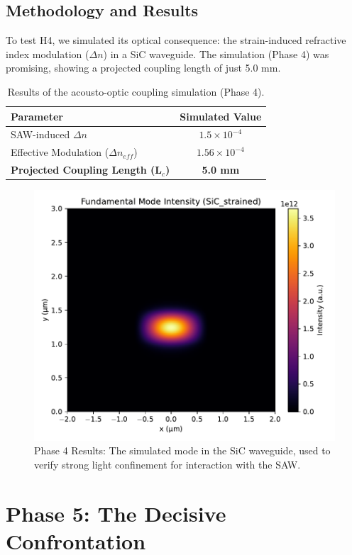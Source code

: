 \documentclass{article}
\begin{document}
\subsection{Methodology and Results}
To test H4, we simulated its optical consequence: the strain-induced refractive index modulation ($\Delta n$) in a SiC waveguide. The simulation (Phase 4) was promising, showing a projected coupling length of just 5.0 mm.

\begin{table}[H]
\caption{Results of the acousto-optic coupling simulation (Phase 4).}
\label{tab:cycle4}
\centering
\begin{tabular}{lc}
\toprule
\textbf{Parameter} & \textbf{Simulated Value} \\
\midrule
SAW-induced $\Delta n$ & $1.5 \times 10^{-4}$ \\
Effective Modulation ($\Delta n_{eff}$) & $1.56 \times 10^{-4}$ \\
\textbf{Projected Coupling Length (L$_c$)} & \textbf{5.0 mm} \\
\bottomrule
\end{tabular}
\end{table}

\begin{figure}[H]
    \centering
    \includegraphics[width=0.7\linewidth]{simulation_v4_mode_SiC_strained.pdf}
    \caption{Phase 4 Results: The simulated mode in the SiC waveguide, used to verify strong light confinement for interaction with the SAW.}
    \label{fig:sicmode}
\end{figure}

\section{Phase 5: The Decisive Confrontation}
\end{document}
